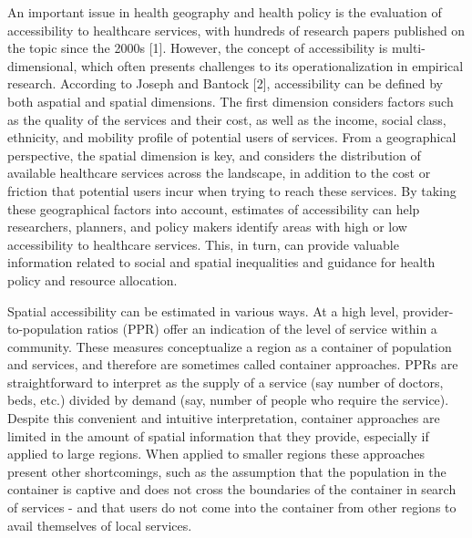 \documentclass[10pt,letterpaper]{article}
\begin{document}
An important issue in health geography and health policy is the
evaluation of accessibility to healthcare services, with hundreds of
research papers published on the topic since the 2000s {[}1{]}. However,
the concept of accessibility is multi-dimensional, which often presents
challenges to its operationalization in empirical research. According to
Joseph and Bantock {[}2{]}, accessibility can be defined by both
aspatial and spatial dimensions. The first dimension considers factors
such as the quality of the services and their cost, as well as the
income, social class, ethnicity, and mobility profile of potential users
of services. From a geographical perspective, the spatial dimension is
key, and considers the distribution of available healthcare services
across the landscape, in addition to the cost or friction that potential
users incur when trying to reach these services. By taking these
geographical factors into account, estimates of accessibility can help
researchers, planners, and policy makers identify areas with high or low
accessibility to healthcare services. This, in turn, can provide
valuable information related to social and spatial inequalities and
guidance for health policy and resource allocation.

Spatial accessibility can be estimated in various ways. At a high level,
provider-to-population ratios (PPR) offer an indication of the level of
service within a community. These measures conceptualize a region as a
container of population and services, and therefore are sometimes called
container approaches. PPRs are straightforward to interpret as the
supply of a service (say number of doctors, beds, etc.) divided by
demand (say, number of people who require the service). Despite this
convenient and intuitive interpretation, container approaches are
limited in the amount of spatial information that they provide,
especially if applied to large regions. When applied to smaller regions
these approaches present other shortcomings, such as the assumption that
the population in the container is captive and does not cross the
boundaries of the container in search of services - and that users do
not come into the container from other regions to avail themselves of
local services.
\end{document}
